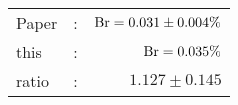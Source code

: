       \begin{tabular}{lcr}
          Paper &:& $\mathrm{Br}  = 0.031\pm 0.004\%$ \\
          this      &:& $\mathrm{Br}  = 0.035\%$ \\
		  ratio   &:& $1.127\pm 0.145$ \\
      \end{tabular}
